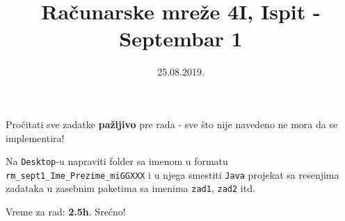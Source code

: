 \documentclass[]{article}
\title{Ra\v{c}unarske mre\v{z}e 4I, Ispit - Septembar 1}
\date{25.08.2019.}
\begin{document}
\makeatletter
\begin{center}

{\fontsize{12pt}{14pt}\selectfont\bfseries\@title\par}
\@date
\vspace{5mm}

Pro\v{c}itati sve zadatke \textbf{pa\v{z}ljivo} pre rada - sve \v{s}to nije navedeno ne mora da se implementira! 

Na \texttt{Desktop}-u napraviti folder sa imenom u formatu \texttt{rm\_sept1\_Ime\_Prezime\_miGGXXX} i u njega smestiti \texttt{Java} projekat sa resenjima zadataka u zasebnim paketima sa imenima \texttt{zad1}, \texttt{zad2} itd. 

Vreme za rad: \textbf{2.5h}. Sre\'{c}no!
\end{center}
\makeatother
\end{document}

